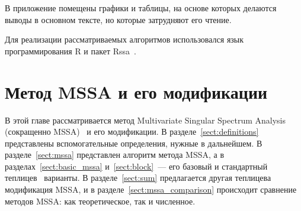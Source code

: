 \documentclass[specialist,
substylefile = spbu.rtx,
               subf,href,colorlinks=true,12pt]{disser}
\theoremstyle{definition}
\begin{document}
В приложение помещены графики и таблицы, на основе которых делаются выводы в основном тексте, но которые затрудняют его чтение.

Для реализации рассматриваемых алгоритмов использовался язык программирования \textsf{R} и пакет \textsf{Rssa}~\cite{Rssa}.

\chapter{Метод MSSA и его модификации}\label{chpt:mssa}
В этой главе рассматривается метод Multivariate Singular Spectrum Analysis (сокращенно MSSA)~\cite{Golyandina2015} и его модификации. В разделе~\ref{sect:definitions} представлены вспомогательные определения, нужные в дальнейшем. В разделе~\ref{sect:mssa} представлен алгоритм метода MSSA, а в разделах~\ref{sect:basic_mssa} и~\ref{sect:block}~--- его базовый и стандартный теплицев~\cite{Plaut1994} варианты. В разделе~\ref{sect:sum} предлагается другая теплицева модификация MSSA, и в разделе~\ref{sect:mssa_comparison} происходит сравнение методов MSSA: как теоретическое, так и численное.
\end{document}
